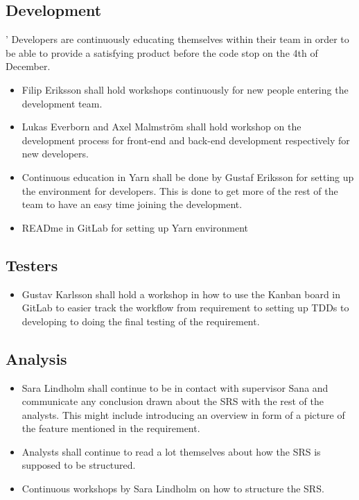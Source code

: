 \documentclass[12pt]{article}
\begin{document}
\subsection{Development}'
Developers are continuously educating themselves within their team in order to be able to provide a satisfying product before the code stop on the 4th of December. 
\begin{itemize}
    \item Filip Eriksson shall hold workshops continuously for new people entering the development team. 
    \item Lukas Everborn and Axel Malmström shall hold workshop on the development process for front-end and back-end development respectively for new developers. 
    \item Continuous education in Yarn shall be done by Gustaf Eriksson for setting up the environment for developers. This is done to get more of the rest of the team to have an easy time joining the development. 
    \item READme in GitLab for setting up Yarn environment
\end{itemize}
\subsection{Testers}
\begin{itemize}
    \item Gustav Karlsson shall hold a workshop in how to use the Kanban board in GitLab to easier track the workflow from requirement to setting up TDDs to developing to doing the final testing of the requirement. 
\end{itemize}
\subsection{Analysis}
    \begin{itemize}
    \item Sara Lindholm shall continue to be in contact with supervisor Sana and communicate any conclusion drawn about the SRS with the rest of the analysts. This might include introducing an overview in form of a picture of the feature mentioned in the requirement. 
    \item Analysts shall continue to read a lot themselves about how the SRS is supposed to be structured.
    \item Continuous workshops by Sara Lindholm on how to structure the SRS. 

\end{itemize}
\end{document}
